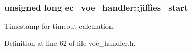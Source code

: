 \subsubsection[{jiffies\-\_\-start}]{\setlength{\rightskip}{0pt plus 5cm}unsigned long {\bf ec\-\_\-voe\-\_\-handler\-::jiffies\-\_\-start}}\label{structec__voe__handler_a394c2e7f86802ae0c78a1d7f5a762cc5}


\-Timestamp for timeout calculation. 



\-Definition at line 62 of file voe\-\_\-handler.\-h.

